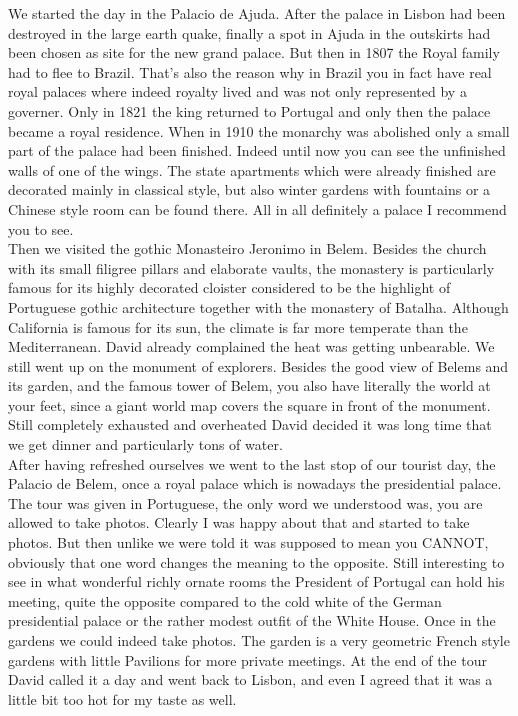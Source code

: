 We started the day in the Palacio de Ajuda. After the palace in Lisbon had been destroyed in the large earth quake, finally a spot in Ajuda in the outskirts had been chosen as site for the new grand palace. But then in 1807 the Royal family had to flee to Brazil. That's also the reason why in Brazil you in fact have real royal palaces where indeed royalty lived and was not only represented by a governer. Only in 1821 the king returned to Portugal and only then the palace became a royal residence. When in 1910 the monarchy was abolished only a small part of the palace had been finished. Indeed until now you can see the unfinished walls of one of the wings. The state apartments which were already finished are decorated mainly in classical style, but also winter gardens with fountains or a Chinese style room can be found there. All in all definitely a palace I recommend you to see. \\
Then we visited the gothic Monasteiro Jeronimo in Belem. Besides the church with its small filigree pillars and elaborate vaults, the monastery is particularly famous for its highly decorated cloister considered to be the highlight of Portuguese gothic architecture together with the monastery of Batalha. Although California is famous for its sun, the climate is far more temperate than the Mediterranean. David already complained the heat was getting unbearable. We still went up on the monument of explorers. Besides the good view of Belems and its garden, and the famous tower of Belem, you also have literally the world at your feet, since a giant world map covers the square in front of the monument. Still completely exhausted and overheated David decided it was long time that we get dinner and particularly tons of water. \\
After having refreshed ourselves we went to the last stop of our tourist day, the Palacio de Belem, once a royal palace which is nowadays the presidential palace. The tour was given in Portuguese, the only word we understood was, you are allowed to take photos. Clearly I was happy about that and started to take photos. But then unlike we were told it was supposed to mean you CANNOT, obviously that one word changes the meaning to the opposite. Still interesting to see in what wonderful richly ornate rooms the President of Portugal can hold his meeting, quite the opposite compared to the cold white of the German presidential palace or the rather modest outfit of the White House. Once in the gardens we could indeed take photos. The garden is a very geometric French style gardens with little Pavilions for more private meetings. At the end of the tour David called it a day and went back to Lisbon, and even I agreed that it was a little bit too hot for my taste as well.\\ 

